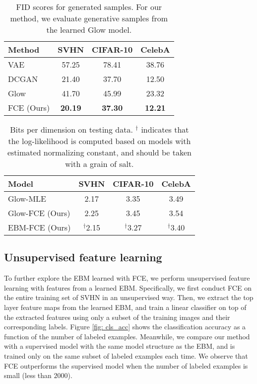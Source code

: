 \documentclass[10pt,twocolumn,letterpaper]{article}
\begin{document}
\begin{table}
\centering
 \caption{FID scores for generated samples. For our method, we evaluate generative samples from the learned Glow model.}
 \label{tab: fid}
 \footnotesize
  \begin{tabular}{lccc}
    \toprule
     Method   & SVHN & CIFAR-10 & CelebA \\
        \midrule
     VAE \cite{kingma2013auto}       &57.25 & 78.41& 38.76 \\
     DCGAN \cite{radford2015unsupervised} &   21.40 & 37.70 & 12.50 \\
     Glow \cite{kingma2018Glow} & 41.70 &  45.99 & 23.32\\
     FCE (Ours) & {\bf 20.19}  & {\bf 37.30} & {\bf 12.21} \\
        \bottomrule
    \end{tabular}
\end{table}

\begin{table}
\centering
 \caption{Bits per dimension on testing data. $^\dagger$ indicates that the log-likelihood is computed based on models with estimated normalizing constant, and should be taken with a grain of salt.}
 \label{tab: llh} 
 \setlength{\tabcolsep}{4pt}
 \footnotesize
  \begin{tabular}{lccc}
    \toprule
        Model & SVHN & CIFAR-10 & CelebA \\
        \midrule
        Glow-MLE &2.17    &  3.35 & 3.49 \\
        Glow-FCE (Ours) & 2.25& 3.45 & 3.54\\
        EBM-FCE (Ours) & $^\dagger$2.15  & $^\dagger$3.27 & $^\dagger$3.40 \\
        \bottomrule
    \end{tabular}
\end{table}




\subsection{Unsupervised feature learning}

To further explore the EBM learned with FCE, we perform unsupervised feature learning with features from a learned EBM. Specifically, we first conduct FCE on the entire training set of SVHN in an unsupervised way. Then, we extract the top layer feature maps from the learned EBM, and train a linear classifier on top of the extracted features using only a subset of the training images and their corresponding labels.  Figure \ref{fig: cls_acc} shows the classification accuracy as a function of the number of labeled examples. Meanwhile, we compare our method with a supervised model with the same model structure as the EBM, and is trained only on the same subset of labeled examples each time. We observe that FCE outperforms the supervised model when the number of labeled examples is small (less than $2000$). 
 
\end{document}
